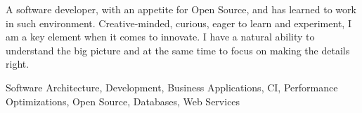 \documentclass[9pt]{developercv} %
\begin{document}
\vspace{0.5cm}



\begin{minipage}[t]{0.42\textwidth} %
	\vspace{-\baselineskip} %
	
  {A software developer, with an appetite for Open Source, and has learned to
  work in such environment. Creative-minded, curious, eager to learn and
  experiment, I am a key element when it comes to innovate. I have a natural
  ability to understand the big picture and at the same time to focus on
  making the details right. }
\end{minipage}
\hfill %
\begin{minipage}[t]{0.42\textwidth}
	\vspace{-\baselineskip} %
  {Software Architecture, Development, Business Applications,
    CI, Performance Optimizations, Open Source, Databases,
    Web Services}\\

  \begin{center}
  \end{center}
\end{minipage}


\end{document}
